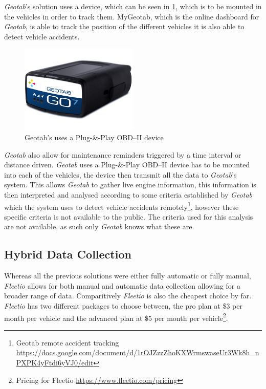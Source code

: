 \textit{Geotab}'s solution uses a device, which can be seen in \cref{fig:Geotab_device}, which is to be mounted in the vehicles in order to track them. MyGeotab, which is the online dashboard for \textit{Geotab}, is able to track the position of the different vehicles it is also able to detect vehicle accidents\cite{geotab}.
\begin{figure}[h!]
    \centering
    \includegraphics[width=0.5\textwidth]{img/geotab-device-side-view.png}
    \caption{Geotab's uses a Plug-\&-Play OBD--II device}
    \label{fig:Geotab_device}
\end{figure}

\textit{Geotab} also allow for maintenance reminders triggered by a time interval or distance driven.
\textit{Geotab} uses a Plug-\&-Play OBD--II device has to be mounted into each of the vehicles, the device then transmit all the data to \textit{Geotab}'s system.
This allows \textit{Geotab} to gather live engine information, this information is then interpreted and analysed according to some criteria established by \textit{Geotab} which the system uses to detect vehicle accidents remotely\footnote{Geotab remote accident tracking \url{https://docs.google.com/document/d/1rOJZzzZhoKXWrmswaseUr3Wk8h_nPXPK4yFtdi6yVJ0/edit}}, however these specific criteria is not available to the public.
The criteria used for this analysis are not available, as such only \textit{Geotab} knows what these are.
\subsection{Hybrid Data Collection}
Whereas all the previous solutions were either fully automatic or fully manual, \textit{Fleetio} allows for both manual and automatic data collection allowing for a broader range of data.
Comparitively \textit{Fleetio} is also the cheapest choice by far.
\textit{Fleetio} has two different packages to choose between, the pro plan at \$3 per month per vehicle and the advanced plan at \$5 per month per vehicle\footnote{Pricing for Fleetio \url{https://www.fleetio.com/pricing}}.
